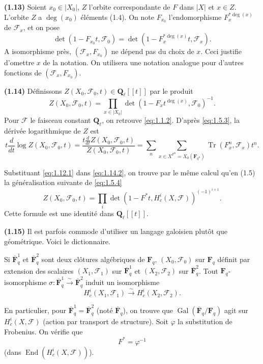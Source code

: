 \documentclass[12pt,a4paper]{amsart}
\theoremstyle{plain}
\theoremstyle{definition}
\theoremstyle{remark}
\DeclareMathOperator{\Tr}{Tr}
\DeclareMathOperator{\Gal}{Gal}
\DeclareMathOperator{\End}{End}
\newcommand{\Q}{\mathbf{Q}}
\newcommand{\F}{\mathbf{F}}
\numberwithin{equation}{section}
\begin{document}
\noindent \textbf{(1.13)} Soient $x_0\in|X_0|$, $Z$ l'orbite correspondante de $F$ dans $|X|$ et $x\in Z$. L'orbite $Z$ a $\deg(x_0)$ \'el\'ements (1.4). On note $F_{x_0}$ l'endomorphisme $F^{*\deg(x)}_x$ de $\mathscr{F}_x$, et on pose
\[
\det(1-F_{x_0}t,\mathscr{F}_0) = \det(1-F^{*\deg(x)}_x t,\mathscr{F}_x).
\]
A isomorphisme pr\`es, $(\mathscr{F}_x,F_{x_0})$ ne d\'epend pas du choix de $x$. Ceci justifie d'omettre $x$ de la notation. On utilisera une notation analogue pour d'autres fonctions de $(\mathscr{F}_x,F_{x_0})$.

\noindent \textbf{(1.14)} D\'efinissons $Z(X_0,\mathscr{F}_0,t)\in\Q_\ell[[t]]$ par le produit
\begin{equation}\label{eq:1.14.1}
Z(X_0,\mathscr{F}_0,t) = \prod_{x\in|X_0|} \det(1-F_x t^{\deg(x)},\mathscr{F}_0)^{-1}.
\end{equation}
Pour $\mathscr{F}$ le faisceau constant $\Q_\ell$, on retrouve \eqref{eq:1.1.2}. D'apr\`es \eqref{eq:1.5.3}, la d\'eriv\'ee logarithmique de $Z$ est
\begin{equation}\label{eq:1.14.2}
t\frac{d}{dt}\log Z(X_0,\mathscr{F}_0,t) = \frac{t\frac{d}{dt}Z(X_0,\mathscr{F}_0,t)}{Z(X_0,\mathscr{F}_0,t)} = \sum_n \sum_{x\in X^{F^n}=X_0(\F_{q^n})} \Tr(F^n_x,\mathscr{F}_x) t^n.
\end{equation}

Substituant \eqref{eq:1.12.1} dans \eqref{eq:1.14.2}, on trouve par le m\^eme calcul qu'en (1.5) la g\'en\'eralisation suivante de \eqref{eq:1.5.4}
\begin{equation}\label{eq:1.14.3}
Z(X_0,\mathscr{F}_0,t) = \prod_i \det(1-F^*t,H^i_c(X,\mathscr{F}))^{(-1)^{i+1}}.
\end{equation}
Cette formule est une identit\'e dans $\Q_\ell[[t]]$.

\noindent \textbf{(1.15)} Il est parfois commode d'utiliser un langage galoisien plut\^ot que g\'eom\'etrique. Voici le dictionnaire.

Si $\overline{\F}_q^1$ et $\overline{\F}_q^2$ sont deux cl\^otures alg\'ebriques de $\F_q$, $(X_0,\mathscr{F}_0)$ sur $\F_q$ d\'efinit par extension des scalaires $(X_1,\mathscr{F}_1)$ sur $\overline{\F}_q^1$ et $(X_2,\mathscr{F}_2)$ sur $\overline{\F}_q^2$. Tout $\F_q$-isomorphisme $\sigma:\overline{\F}_q^1\xrightarrow{\sim}\overline{\F}_q^2$ induit un isomorphisme
\[
H^i_c(X_1,\mathscr{F}_1) \xrightarrow{\sim} H^i_c(X_2,\mathscr{F}_2).
\]

En particulier, pour $\overline{\F}_q^1=\overline{\F}_q^2$ (not\'e $\overline{\F}_q$), on trouve que $\Gal(\overline{\F}_q/\F_q)$ agit sur $H^i_c(X,\mathscr{F})$ (action par transport de structure). Soit $\varphi$ la substitution de Frobenius. On v\'erifie que
\[
F^* = \varphi^{-1}
\]
(dans $\End(H^i_c(X,\mathscr{F}))$).
\end{document}
